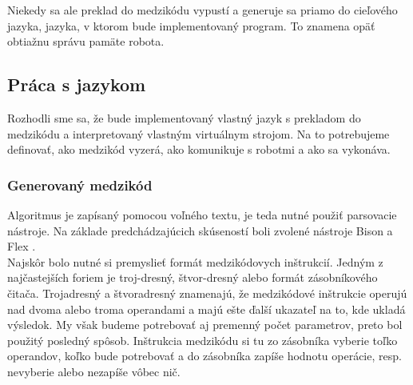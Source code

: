 Niekedy sa ale preklad do medzikódu vypustí a generuje sa priamo do cieľového jazyka, jazyka, v ktorom bude implementovaný program. To znamena opäť obtiažnu správu pamäte robota. \\ %

\subsection{Práca s jazykom}
Rozhodli sme sa, že bude implementovaný vlastný jazyk s prekladom do medzikódu a interpretovaný vlastným virtuálnym strojom. Na to potrebujeme definovať, ako medzikód vyzerá, ako komunikuje s robotmi a ako sa vykonáva.

\subsubsection{Generovaný medzikód}
Algoritmus je zapísaný pomocou voľného textu, je teda nutné použiť parsovacie nástroje. Na základe predchádzajúcich skúseností boli zvolené nástroje Bison a Flex \cite{flex}. \\
Najskôr bolo nutné si premyslieť formát medzikódovych inštrukcií. Jedným z najčastejších foriem je troj-dresný, štvor-dresný alebo formát zásobníkového čitača. Trojadresný a štvoradresný znamenajú, že medzikódové inštrukcie operujú nad dvoma alebo troma operandami a majú ešte ďalší ukazateľ na to, kde ukladá výsledok. My však budeme potrebovať aj premenný počet parametrov, preto bol použitý posledný spôsob. Inštrukcia medzikódu si tu zo zásobníka vyberie toľko operandov, koľko bude potrebovať a do zásobníka zapíše hodnotu operácie, resp. nevyberie alebo nezapíše vôbec nič.\\ %

